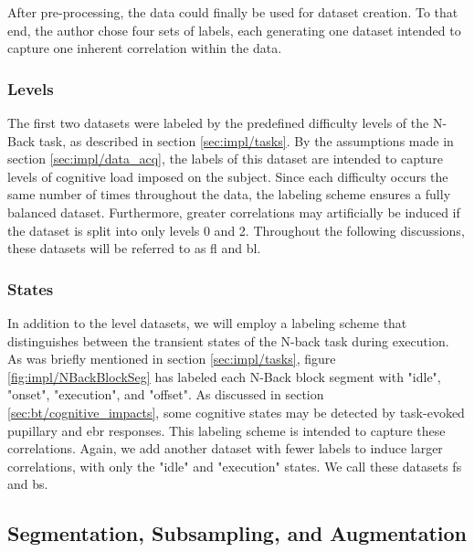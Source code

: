 After pre-processing, the data could finally be used for dataset creation. To that end, the author chose four sets of labels, each generating one dataset intended to capture one inherent correlation within the data.

\subsubsection{Levels}

The first two datasets were labeled by the predefined difficulty levels of the N-Back task, as described in section \ref{sec:impl/tasks}. By the assumptions made in section \ref{sec:impl/data_acq}, the labels of this dataset are intended to capture levels of cognitive load imposed on the subject. Since each difficulty occurs the same number of times throughout the data, the labeling scheme ensures a fully balanced dataset. Furthermore, greater correlations may artificially be induced if the dataset is split into only levels 0 and 2. Throughout the following discussions, these datasets will be referred to as \acrfull{fl} and \acrfull{bl}.

\subsubsection{States}

In addition to the level datasets, we will employ a labeling scheme that distinguishes between the transient states of the N-back task during execution. As was briefly mentioned in section \ref{sec:impl/tasks}, figure \ref{fig:impl/NBackBlockSeg} has labeled each N-Back block segment with "idle", "onset", "execution", and "offset". 
As discussed in section \ref{sec:bt/cognitive_impacts}, some cognitive states may be detected by task-evoked pupillary and \acrshort{ebr} responses. This labeling scheme is intended to capture these correlations. Again, we add another dataset with fewer labels to induce larger correlations, with only the "idle" and "execution" states. We call these datasets \acrfull{fs} and \acrfull{bs}.

\subsection{Segmentation, Subsampling, and Augmentation}

